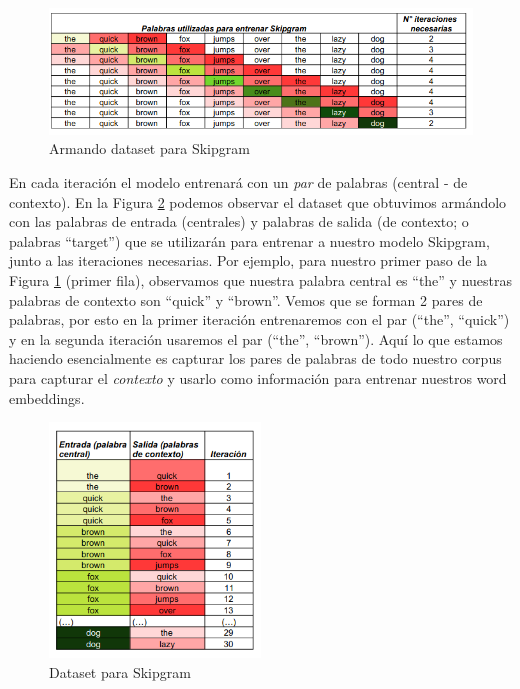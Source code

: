 \documentclass[12pt,a4paper]{article}
\begin{document}
\begin{sloppypar}
\begin{figure}[H]    %
\centering
\includegraphics[width=1\textwidth]{images/Ejemplo_Skipgram/1_EjSkip.png}
\caption{Armando dataset para Skipgram} 
\label{fig:1_EjSkip}
\end{figure}

En cada iteración el modelo entrenará con un \textit{par} de palabras (central - de contexto). En la Figura \ref{fig:2_EjSkip} podemos observar el dataset que obtuvimos armándolo con las palabras de entrada (centrales) y palabras de salida (de contexto; o palabras “target”) que se utilizarán para entrenar a nuestro modelo Skipgram, junto a las iteraciones necesarias.  Por ejemplo, para nuestro primer paso de la Figura \ref{fig:1_EjSkip} (primer fila), observamos que nuestra palabra central es “the” y nuestras palabras de contexto son “quick” y “brown”. Vemos que se forman 2 pares de palabras, por esto en la primer iteración entrenaremos con el par (“the”, “quick”) y en la segunda iteración usaremos el par (“the”, “brown”). Aquí lo que estamos haciendo esencialmente es capturar los pares de palabras de todo nuestro corpus para capturar el \textit{contexto} y usarlo como información para entrenar nuestros word embeddings. 

\begin{figure}[H]    %
\centering
\includegraphics[width=0.5\textwidth]{images/Ejemplo_Skipgram/2_EjSkip.png}
\caption{Dataset para Skipgram} 
\label{fig:2_EjSkip}
\end{figure}


\end{sloppypar}
\end{document}
